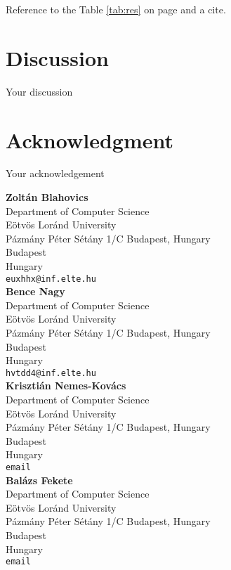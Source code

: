 \documentclass[10pt,leqno,twoside]{article}
\begin{document}
Reference to the Table \ref{tab:res} on page \pageref{tab:res} and a cite.



\section{Discussion} %
Your discussion

\section*{Acknowledgment}
Your acknowledgement

\printbibliography[title=References]


\clearpage
\vspace{2cm}

\noindent\textbf{Zoltán Blahovics}\\
Department of Computer Science\\Eötvös Loránd University\\Pázmány Péter Sétány 1/C Budapest, Hungary\\
Budapest\\
Hungary\\
{\tt euxhhx@inf.elte.hu}\\

\noindent\textbf{Bence Nagy}\\
Department of Computer Science\\Eötvös Loránd University\\Pázmány Péter Sétány 1/C Budapest, Hungary\\
Budapest\\
Hungary\\
{\tt hvtdd4@inf.elte.hu}\\

\noindent\textbf{Krisztián Nemes-Kovács}\\
Department of Computer Science\\Eötvös Loránd University\\Pázmány Péter Sétány 1/C Budapest, Hungary\\
Budapest\\
Hungary\\
{\tt email}\\

\noindent\textbf{Balázs Fekete}\\
Department of Computer Science\\Eötvös Loránd University\\Pázmány Péter Sétány 1/C Budapest, Hungary\\
Budapest\\
Hungary\\
{\tt email}\\
\end{document}
